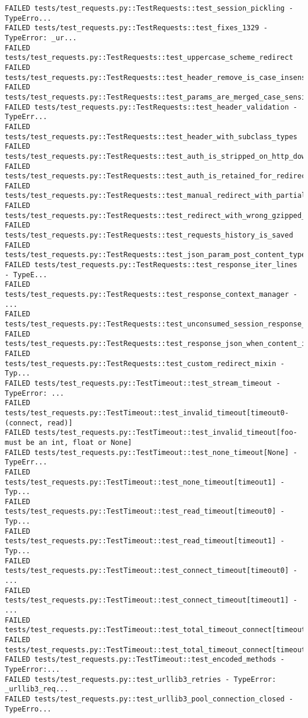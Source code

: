 \begin{Verbatim}[fontsize=\small, breaklines=true, breakanywhere=true]
FAILED tests/test_requests.py::TestRequests::test_session_pickling - TypeErro...
FAILED tests/test_requests.py::TestRequests::test_fixes_1329 - TypeError: _ur...
FAILED tests/test_requests.py::TestRequests::test_uppercase_scheme_redirect
FAILED tests/test_requests.py::TestRequests::test_header_remove_is_case_insensitive
FAILED tests/test_requests.py::TestRequests::test_params_are_merged_case_sensitive
FAILED tests/test_requests.py::TestRequests::test_header_validation - TypeErr...
FAILED tests/test_requests.py::TestRequests::test_header_with_subclass_types
FAILED tests/test_requests.py::TestRequests::test_auth_is_stripped_on_http_downgrade
FAILED tests/test_requests.py::TestRequests::test_auth_is_retained_for_redirect_on_host
FAILED tests/test_requests.py::TestRequests::test_manual_redirect_with_partial_body_read
FAILED tests/test_requests.py::TestRequests::test_redirect_with_wrong_gzipped_header
FAILED tests/test_requests.py::TestRequests::test_requests_history_is_saved
FAILED tests/test_requests.py::TestRequests::test_json_param_post_content_type_works
FAILED tests/test_requests.py::TestRequests::test_response_iter_lines - TypeE...
FAILED tests/test_requests.py::TestRequests::test_response_context_manager - ...
FAILED tests/test_requests.py::TestRequests::test_unconsumed_session_response_closes_connection
FAILED tests/test_requests.py::TestRequests::test_response_json_when_content_is_None
FAILED tests/test_requests.py::TestRequests::test_custom_redirect_mixin - Typ...
FAILED tests/test_requests.py::TestTimeout::test_stream_timeout - TypeError: ...
FAILED tests/test_requests.py::TestTimeout::test_invalid_timeout[timeout0-(connect, read)]
FAILED tests/test_requests.py::TestTimeout::test_invalid_timeout[foo-must be an int, float or None]
FAILED tests/test_requests.py::TestTimeout::test_none_timeout[None] - TypeErr...
FAILED tests/test_requests.py::TestTimeout::test_none_timeout[timeout1] - Typ...
FAILED tests/test_requests.py::TestTimeout::test_read_timeout[timeout0] - Typ...
FAILED tests/test_requests.py::TestTimeout::test_read_timeout[timeout1] - Typ...
FAILED tests/test_requests.py::TestTimeout::test_connect_timeout[timeout0] - ...
FAILED tests/test_requests.py::TestTimeout::test_connect_timeout[timeout1] - ...
FAILED tests/test_requests.py::TestTimeout::test_total_timeout_connect[timeout0]
FAILED tests/test_requests.py::TestTimeout::test_total_timeout_connect[timeout1]
FAILED tests/test_requests.py::TestTimeout::test_encoded_methods - TypeError:...
FAILED tests/test_requests.py::test_urllib3_retries - TypeError: _urllib3_req...
FAILED tests/test_requests.py::test_urllib3_pool_connection_closed - TypeErro...

\end{Verbatim}
